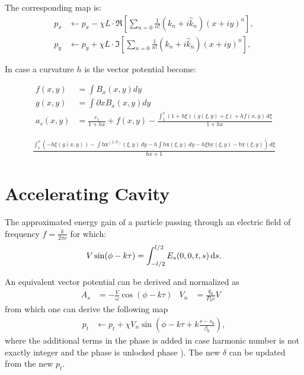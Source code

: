 \documentclass[english]{article}
\begin{document}
The corresponding map is:
\begin{align}
  p_x &\leftarrow p_x - \chi L\cdot\Re\left[\sum_{n=0} \frac{1}{n!} (k_n + i\hat k_n) (x+iy)^n \right], \\
  p_y &\leftarrow p_y + \chi L\cdot\Im\left[\sum_{n=0} \frac{1}{n!} (k_n + i\hat k_n) (x+iy)^n \right],
\end{align}

In case a curvature $h$ is the vector potential become:

\begin{align}
f(x,y)&=\int B_x(x,y) dy  \\
g(x,y)&=\int \partial x  B_x(x,y) dy \\
a_s(x,y)&=\frac{c_1}{1 + h x} + f(x,y) -
   \frac{\int_1^x (1 + h \xi) (g(\xi,y)+\xi) +h f(x,y)  \, d\xi}{1+ h x}
\end{align}

\begin{align}
\frac{\int_1^x \left(-h \xi \left(g(x,y)\right)-\int \text{bx}^{(1,0)}(\xi,y) \, dy-h \int \text{bx}(\xi,y) \,
   dy-h \xi \text{by}(\xi,y)-\text{by}(\xi,y)\right) \, d\xi}{h x+1}
\end{align}



\section{Accelerating Cavity}

The approximated energy gain of a particle passing through an electric field of frequency $f=\frac{k}{2\pi c}$ for which:
\begin{align}
V \sin(\phi - k \tau) = \int_{-l/2}^{l/2} E_s(0,0,t,s)  {\rm \,d}s.
\end{align}

An equivalent vector potential can be derived and normalized as
\begin{align}
A_s& = - \frac{V}{\omega} \cos(\phi - k \tau ) & 
V_n&=  \frac{q_0}{P_0 c} V  & 
\end{align}
from which one can derive the following map
\begin{align}
p_t & \leftarrow p_t + \chi V_n \sin(\phi - k \tau + k \frac{s-s_0}{\beta_0}  ),
\end{align}
where the additional terms in the phase is added in case harmonic number is not exactly integer and the phase is unlocked phase ). The new $\delta$ can be updated from the new $p_t$.
\end{document}
